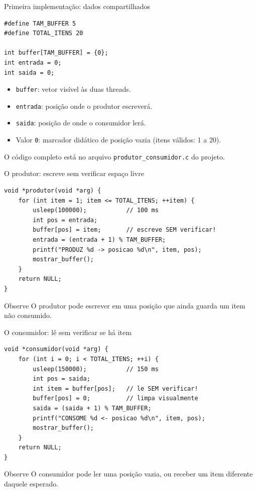 \documentclass[aspectratio=169,11pt]{beamer}
\begin{document}
\begin{frame}[fragile]{Primeira implementação: dados compartilhados}
\begin{lstlisting}
#define TAM_BUFFER 5
#define TOTAL_ITENS 20

int buffer[TAM_BUFFER] = {0};
int entrada = 0;
int saida = 0;
\end{lstlisting}
\vspace{0.5em}
\begin{itemize}
\item \texttt{buffer}: vetor visível às duas threads.
\item \texttt{entrada}: posição onde o produtor escreverá.
\item \texttt{saida}: posição de onde o consumidor lerá.
\item Valor \texttt{0}: marcador didático de posição vazia (itens válidos: 1 a 20).
\end{itemize}
\vfill
\textcolor{cinza}{\footnotesize O código completo está no arquivo \texttt{produtor\_consumidor.c} do projeto.}
\end{frame}

\begin{frame}[fragile]{O produtor: escreve sem verificar espaço livre}
\begin{lstlisting}
void *produtor(void *arg) {
    for (int item = 1; item <= TOTAL_ITENS; ++item) {
        usleep(100000);           // 100 ms
        int pos = entrada;
        buffer[pos] = item;       // escreve SEM verificar!
        entrada = (entrada + 1) % TAM_BUFFER;
        printf("PRODUZ %d -> posicao %d\n", item, pos);
        mostrar_buffer();
    }
    return NULL;
}
\end{lstlisting}
\begin{block}{Observe}
O produtor pode escrever em uma posição que ainda guarda um item não consumido.
\end{block}
\end{frame}

\begin{frame}[fragile]{O consumidor: lê sem verificar se há item}
\begin{lstlisting}
void *consumidor(void *arg) {
    for (int i = 0; i < TOTAL_ITENS; ++i) {
        usleep(150000);           // 150 ms
        int pos = saida;
        int item = buffer[pos];   // le SEM verificar!
        buffer[pos] = 0;          // limpa visualmente
        saida = (saida + 1) % TAM_BUFFER;
        printf("CONSOME %d <- posicao %d\n", item, pos);
        mostrar_buffer();
    }
    return NULL;
}
\end{lstlisting}
\begin{block}{Observe}
O consumidor pode ler uma posição vazia, ou receber um item diferente daquele esperado.
\end{block}
\end{frame}
\end{document}
